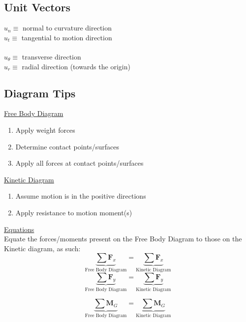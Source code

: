 \documentclass[twocolumn, 12pt]{article}
\begin{document}
\subsection*{Unit Vectors}


\(\hat{u}_n \equiv \) normal to curvature direction \\
\(\hat{u}_t \equiv\) tangential to motion direction\\ 
\vspace{5pt}\\
\(\hat{u}_\theta \equiv \) transverse direction\\
\(\hat{u}_r \equiv \) radial direction (towards the origin)\\

\subsection*{Diagram Tips}
\underline{Free Body Diagram}
\begin{enumerate}
    \item Apply weight forces
    \item Determine contact points/surfaces
    \item Apply all forces at contact points/surfaces
\end{enumerate}
\underline{Kinetic Diagram}
\begin{enumerate}
    \item Assume motion is in the positive directions
    \item Apply resistance to motion moment(s)
\end{enumerate}

\noindent
\underline{Equations}\\

\noindent
Equate the forces/moments present on the Free Body Diagram to those on the Kinetic diagram, as such:
\begin{equation*}
    \underbrace{\sum\textbf{F}_x}_{\text{Free Body Diagram}} = \underbrace{ \sum \textbf{F}_x}_{\text{Kinetic Diagram}}
\end{equation*}
\begin{equation*}
    \underbrace{\sum\textbf{F}_y}_{\text{Free Body Diagram}} = \underbrace{ \sum \textbf{F}_y}_{\text{Kinetic Diagram}}
\end{equation*}

\begin{equation*}
    \underbrace{\sum\textbf{M}_G}_{\text{Free Body Diagram}} = \underbrace{ \sum \textbf{M}_G}_{\text{Kinetic Diagram}}
\end{equation*}
\end{document}

